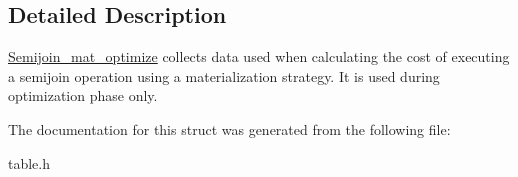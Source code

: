 \subsection{Detailed Description}
\mbox{\hyperlink{structSemijoin__mat__optimize}{Semijoin\+\_\+mat\+\_\+optimize}} collects data used when calculating the cost of executing a semijoin operation using a materialization strategy. It is used during optimization phase only. 

The documentation for this struct was generated from the following file\+:\begin{DoxyCompactItemize}
\item 
table.\+h\end{DoxyCompactItemize}
